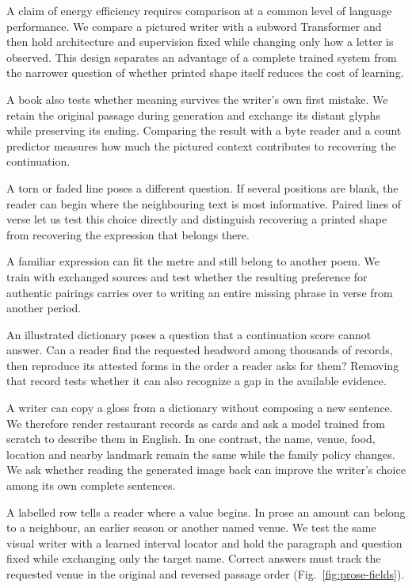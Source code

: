 \documentclass[12pt,a4paper]{article}
\providecommand{\DIFadd}[1]{{\protect\color{blue} \sf #1}} %
\begin{document}
\DIFadd{A claim of energy efficiency requires comparison at a common level of language performance. We compare a pictured writer with a subword Transformer and then hold architecture and supervision fixed while changing only how a letter is observed. This design separates an advantage of a complete trained system from the narrower question of whether printed shape itself reduces the cost of learning.
}

\DIFadd{A book also tests whether meaning survives the writer's own first mistake. We retain the original passage during generation and exchange its distant glyphs while preserving its ending. Comparing the result with a byte reader and a count predictor measures how much the pictured context contributes to recovering the continuation.
}

\DIFadd{A torn or faded line poses a different question. If several positions are blank, the reader can begin where the neighbouring text is most informative. Paired lines of verse let us test this choice directly and distinguish recovering a printed shape from recovering the expression that belongs there.
}

\DIFadd{A familiar expression can fit the metre and still belong to another poem. We train with exchanged sources and test whether the resulting preference for authentic pairings carries over to writing an entire missing phrase in verse from another period.
}

\DIFadd{An illustrated dictionary poses a question that a continuation score cannot answer. Can a reader find the requested headword among thousands of records, then reproduce its attested forms in the order a reader asks for them? Removing that record tests whether it can also recognize a gap in the available evidence.
}


\DIFadd{A writer can copy a gloss from a dictionary without composing a new sentence. We therefore render restaurant records as cards and ask a model trained from scratch to describe them in English. In one contrast, the name, venue, food, location and nearby landmark remain the same while the family policy changes. We ask whether reading the generated image back can improve the writer's choice among its own complete sentences.
}

\DIFadd{A labelled row tells a reader where a value begins. In prose an amount can belong to a neighbour, an earlier season or another named venue. We test the same visual writer with a learned interval locator and hold the paragraph and question fixed while exchanging only the target name. Correct answers must track the requested venue in the original and reversed passage order (Fig.~\ref{fig:prose-fields}).
}
\end{document}
